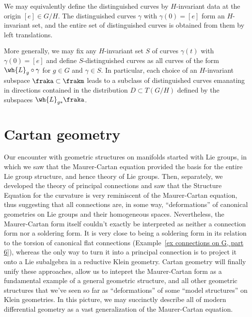 \begin{rem}
    We may equivalently define the distinguished curves by $H$-invariant data at the origin $[e]\in G\slash H$. The distinguished curves $\gamma$ with $\gamma(0)=[e]$ form an $H$-invariant set, and the entire set of distinguished curves is obtained from them by left translations.

    More generally, we may fix any $H$-invariant set $S$ of curves $\gamma(t)$ with $\gamma(0)=[e]$ and define $S$-distinguished curves as all curves of the form $\wh{L}_g\circ\gamma$ for $g\in G$ and $\gamma\in S$. In particular, each choice of an $H$-invariant subspace $\fraka\subset\frakm$ leads to a subclass of distinguished curves emanating in directions contained in the distribution $D\subset T(G\slash H)$ defined by the subspaces $\wh{L}_{g\ast}\fraka$.
\end{rem}











\section{Cartan geometry}


Our encounter with geometric structures on manifolds started with Lie groups, in which we saw that the Maurer-Cartan equation provided the basis for the entire Lie group structure, and hence theory of Lie groups. Then, separately, we developed the theory of principal connections and saw that the Structure Equation for the curvature is very reminiscent of the Maurer-Cartan equation, thus suggesting that all connections are, in some way, ``deformations'' of canonical geometries on Lie groups and their homogeneous spaces. Nevertheless, the Maurer-Cartan form itself couldn't exactly be interpreted as neither a connection form nor a soldering form. It is very close to being a soldering form in its relation to the torsion of canonical flat connections (Example~\ref{ex connections on G, part 6}), whereas the only way to turn it into a principal connection is to project it onto a Lie subalgebra in a reductive Klein geometry. Cartan geometry will finally unify these approaches, allow us to intepret the Maurer-Cartan form as a fundamental example of a general geometric structure, and all other geometric structures that we've seen so far as ``deformations'' of some ``model structures'' on Klein geometries. In this picture, we may succinctly describe all of modern differential geometry as a vast generalization of the Maurer-Cartan equation.



